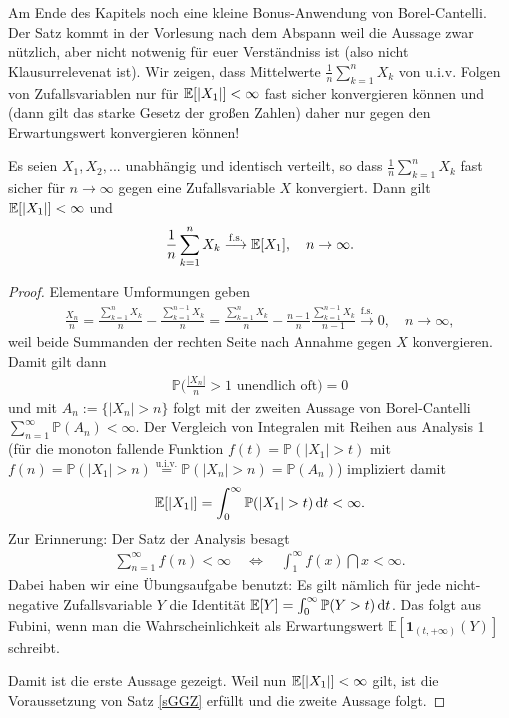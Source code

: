 Am Ende des Kapitels noch eine kleine Bonus-Anwendung von Borel-Cantelli. Der Satz kommt in der Vorlesung nach dem Abspann weil die Aussage zwar n\"utzlich, aber nicht notwenig f\"ur euer Verst\"andniss ist (also nicht Klausurrelevenat ist). Wir zeigen, dass Mittelwerte $\frac 1 n \sum_{k=1}^n X_k$ von u.i.v. Folgen von Zufallsvariablen nur f\"ur $\mathbb{E}[|X_1|]<\infty$ fast sicher konvergieren k\"onnen und (dann gilt das starke Gesetz der gro\ss en Zahlen) daher nur gegen den Erwartungswert konvergieren k\"onnen!
\begin{satz}
	Es seien $X_1,X_2,...$ unabh\"angig und identisch verteilt, so dass $\frac 1 n \sum_{k=1}^n X_k$ fast sicher f\"ur $n\to\infty$ gegen eine Zufallsvariable $X$ konvergiert. Dann gilt $\mathbb{E}[|X_1|]<\infty$ und 
	\begin{align*}
		\frac 1 n \sum_{k=1}^n X_k \overset{\text{f.s.}}{\longrightarrow} \mathbb{E}[X_1],\quad n\to\infty.
	\end{align*}	 
\end{satz}
\begin{proof}
Elementare Umformungen geben
\begin{align*}
	\frac{X_n}{n}=\frac{\sum_{k=1}^n X_k}{n}-\frac{\sum_{k=1}^{n-1}X_k}{n}= \frac{\sum_{k=1}^nX_k}{n}-\frac{n-1}{n} \frac{\sum_{k=1}^{n-1}X_k}{n-1}\overset{\text{f.s.}}{\to} 0,\quad n\to \infty,
\end{align*}
weil beide Summanden der rechten Seite nach Annahme gegen $X$ konvergieren. Damit gilt dann 
\begin{align*}
	\mathbb P\Big(\frac{|X_n|}{n}>1\text{ unendlich oft}\Big)=0
\end{align*}
und mit $A_n:=\{|X_n|>n\}$ folgt mit der zweiten Aussage von Borel-Cantelli $\sum_{n=1}^\infty \mathbb P(A_n)<\infty.$ Der Vergleich von Integralen mit Reihen aus Analysis 1 (f\"ur die monoton fallende Funktion $f(t)=\mathbb P(|X_1|>t)$ mit $f(n)=\mathbb P(|X_1|>n)\overset{\text{u.i.v.}}{=}\mathbb P(|X_n|>n)=\mathbb P(A_n)$) impliziert damit 
\begin{align*}
	\E[|X_1|]=\int_0^\infty \mathbb P(|X_1|>t)\dint t<\infty.
\end{align*}
Zur Erinnerung: Der Satz der Analysis besagt
\begin{align*}
	\sum_{n=1}^\infty f(n)<\infty\quad \Leftrightarrow \quad \int_1^\infty f(x)\dint x<\infty.
\end{align*}
Dabei haben wir eine \"Ubungsaufgabe benutzt: Es gilt n\"amlich f\"ur jede nicht-negative Zufallsvariable $Y$ die Identit\"at $\mathbb{E}[Y]=\int_0^\infty \mathbb P(Y>t)\, \mathrm{d} t$. Das folgt aus Fubini, wenn man die Wahrscheinlichkeit als Erwartungswert $\mathbb E[\mathbf{1}_{(t,+\infty)}(Y)]$ schreibt.\smallskip


Damit ist die erste Aussage gezeigt. Weil nun $\mathbb{E}[|X_1|]<\infty$ gilt, ist die Voraussetzung von Satz \ref{sGGZ} erf\"ullt und die zweite Aussage folgt.
\end{proof}
\marginpar{\textcolor{red}{Vorlesung 27}}


